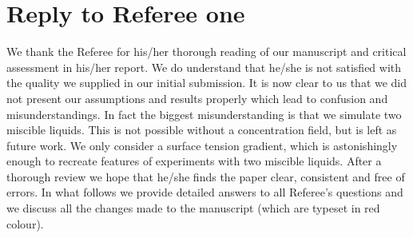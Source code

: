 \documentclass[12pt,english]{article}
\begin{document}

\section*{Reply to Referee one}

We thank the Referee for his/her thorough reading of our manuscript and critical assessment in his/her report.
We do understand that he/she is not satisfied with the quality we supplied in our initial submission.
It is now clear to us that we did not present our assumptions and results properly which lead to confusion and misunderstandings.
In fact the biggest misunderstanding is that we simulate two miscible liquids.
This is not possible without a concentration field, but is left as future work.
We only consider a surface tension gradient, which is astonishingly enough to recreate features of experiments with two miscible liquids.
After a thorough review we hope that he/she finds the paper clear, consistent and free of errors.
In what follows we provide detailed answers to all Referee's questions and we discuss all the changes made to the manuscript
(which are typeset in red colour).
\end{document}
